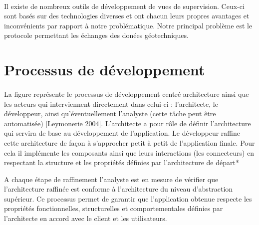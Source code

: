\paragraph{}
Il existe de nombreux outils de développement de vues de supervision. Ceux-ci sont
basés sur des technologies diverses et ont chacun leurs propres avantages et
inconvénients par rapport à notre problématique. Notre principal problème est le 
protocole permettant les échanges des donées géotechniques.

\section{Processus de développement}
\paragraph{}
La figure représente le processus de développement centré architecture ainsi que
les acteurs qui interviennent directement dans celui-ci : l’architecte, le développeur, ainsi
qu’éventuellement l’analyste (cette tâche peut être automatisée) [Leymonerie 2004]. 
L’architecte a pour rôle de définir l’architecture qui servira de base au développement
de l’application. Le développeur raffine cette architecture de façon à s’approcher petit à
petit de l’application finale. Pour cela il implémente les composants ainsi que leurs
interactions (les connecteurs) en respectant la structure et les propriétés définies par
l’architecture de départ* \par 
A chaque étape de raffinement l’analyste est en mesure de
vérifier que l’architecture raffinée est conforme à l’architecture du niveau d’abstraction
supérieur. Ce processus permet de garantir que l’application obtenue respecte les
propriétés fonctionnelles, structurelles et comportementales définies par l’architecte en
accord avec le client et les utilisateurs.